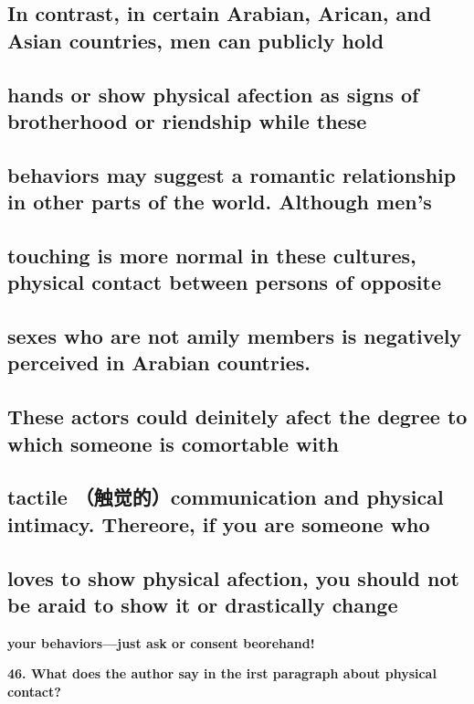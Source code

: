 \documentclass[UTF8,11pt]{ctexart}
\begin{document}
\subsection*{\textbf{In contrast, in certain Arabian, Arican, and Asian countries, men can publicly hold}}


\subsection*{\textbf{hands or show physical afection as signs of brotherhood or riendship while these}}


\subsection*{\textbf{behaviors may suggest a romantic relationship in other parts of the world. Although men's}}


\subsection*{\textbf{touching is more normal in these cultures, physical contact between persons of opposite}}


\subsection*{\textbf{sexes who are not amily members is negatively perceived in Arabian countries.}}


\subsection*{\textbf{These actors could deinitely afect the degree to which someone is comortable with}}


\subsection*{\textbf{tactile} （触觉的）\textbf{communication and physical intimacy. Thereore, if you are someone who}}


\subsection*{\textbf{loves to show physical afection, you should not be araid to show it or drastically change}}


\textbf{your behaviors—just ask or consent beorehand!}


\textbf{46. What does the author say in the irst paragraph about physical contact?}
\end{document}
